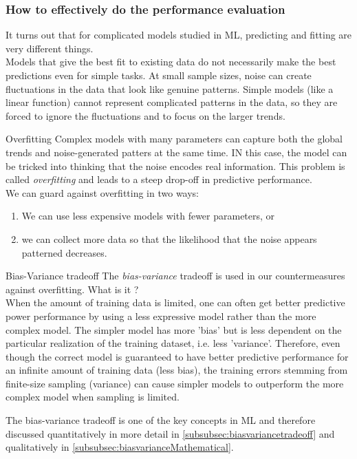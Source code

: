 \subsubsection{How to effectively do the performance evaluation}
It turns out that for complicated models studied in ML, predicting and fitting are very different things.\\
	Models that give the best fit to existing data do not necessarily make the best predictions even for simple tasks. At small sample sizes, noise can create fluctuations in the data that look like genuine patterns. Simple models (like a linear function) cannot represent complicated patterns in the data, so they are forced to ignore the fluctuations and to focus on the larger trends. 
\begin{mybox}{Overfitting}
	\label{subsubsec:overfitting}
Complex models with many parameters can capture both the global trends and noise-generated patters at the same time. IN this case, the model can be tricked into thinking that the noise encodes real information. This problem is called \emph{overfitting} and leads to a steep drop-off in predictive performance.\\
We can guard against overfitting in two ways:
\begin{enumerate}
	\item We can use less expensive models with fewer parameters, or
	\item we can collect more data so that the likelihood that the noise appears patterned decreases.
\end{enumerate}
\end{mybox}
\begin{mybox}{Bias-Variance tradeoff}
	\label{subsubsec:biasvariancetradeoff}
	The \emph{bias-variance} tradeoff is used in our countermeasures against overfitting. What is it ?\\When the amount of training data is limited, one can often get better predictive power performance by using a less expressive model rather than the more complex model. The simpler model has more ’bias’ but is less dependent on the particular realization of the training dataset, i.e. less ’variance’. Therefore, even though the correct model is guaranteed to have better predictive performance for an infinite amount of training data (less bias), the training errors stemming from finite-size sampling (variance) can cause simpler models to outperform the more complex model when sampling is limited.
\end{mybox}
The bias-variance tradeoff is one of the key concepts in ML and therefore discussed quantitatively in more detail in \ref{subsubsec:biasvariancetradeoff} and qualitatively in \ref{subsubsec:biasvarianceMathematical}.\\
